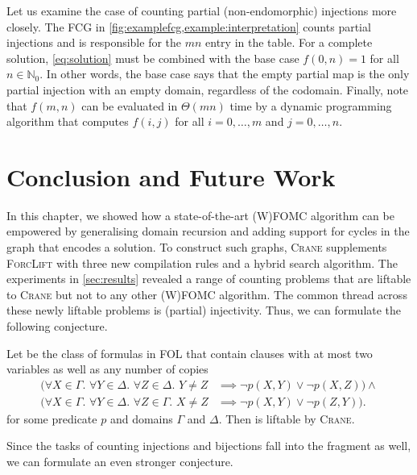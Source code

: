 Let us examine the case of counting partial (non-endomorphic) injections more
closely. The FCG in \cref{fig:examplefcg,example:interpretation} counts partial
injections and is responsible for the $mn$ entry in the table. For a complete
solution, \cref{eq:solution} must be combined with the base case $f(0, n) = 1$
for all $n \in \mathbb{N}_{0}$. In other words, the base case says that the
empty partial map is the only partial injection with an empty domain, regardless
of the codomain. Finally, note that $f(m, n)$ can be evaluated in $\Theta(mn)$
time by a dynamic programming algorithm that computes $f(i, j)$ for all
$i = 0, \dots, m$ and $j = 0, \dots, n$.

\section{Conclusion and Future Work}


In this chapter, we showed how a state-of-the-art (W)FOMC algorithm can be
empowered by generalising domain recursion and adding support for cycles in the
graph that encodes a solution. To construct such graphs, \textsc{Crane}
supplements \textsc{ForcLift} \citep{DBLP:conf/ijcai/BroeckTMDR11} with three
new compilation rules and a hybrid search algorithm. The experiments in
\cref{sec:results} revealed a range of counting problems that are liftable to
\textsc{Crane} but not to any other (W)FOMC algorithm. The common thread across
these newly liftable problems is (partial) injectivity. Thus, we can formulate
the following conjecture.

\begin{conjecture}
  Let \IFO{} be the class of formulas in FOL that contain clauses with at most
  two variables as well as any number of copies
  \begin{align*}
    (\forall X \in \Gamma\text{. }\forall Y \in \Delta\text{. }\forall Z \in \Delta\text{. }Y \ne Z &\implies \neg p(X, Y) \lor \neg p(X, Z)) \land \\
    (\forall X \in \Gamma\text{. }\forall Y \in \Delta\text{. }\forall Z \in \Gamma\text{. }X \ne Z &\implies \neg p(X, Y) \lor \neg p(Z, Y)).
  \end{align*}
  for some predicate $p$ and domains $\Gamma$ and $\Delta$. Then \IFO{} is
  liftable by \textsc{Crane}.
\end{conjecture}

Since the tasks of counting injections and bijections fall into the \Ctwo{}
fragment as well, we can formulate an even stronger conjecture.

